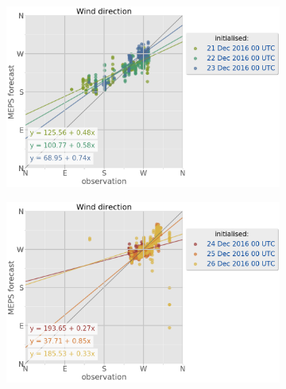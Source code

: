 \begin{figure}
	\begin{subfigure}[b]{0.49\textwidth}
		\includegraphics[trim={0.cm 0cm 12.5cm 0cm},clip,
		width=\textwidth]{./fig_sfc_wd/obs_model_20161221_23_00}
		\caption{}\label{fig:scat:wd2123}
	\end{subfigure}
	\begin{subfigure}[b]{0.49\textwidth}
		\includegraphics[trim={0.cm 0cm 12.5cm 0cm},clip,
		width=\textwidth]{./fig_sfc_wd/obs_model_20161224_26_00}
		\caption{}\label{fig:scat:wd2426}
	\end{subfigure}
	

\end{figure}
